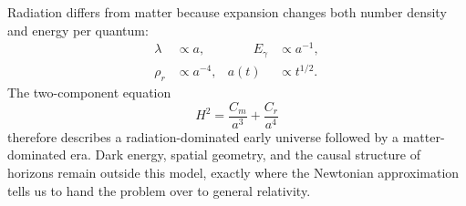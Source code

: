 Radiation differs from matter because expansion changes both number density and energy per quantum:
\begin{equation}
\begin{aligned}
\lambda&\propto a,
&\qquad E_\gamma&\propto a^{-1},\\
\rho_r&\propto a^{-4},
& a(t)&\propto t^{1/2}.
\end{aligned}
\end{equation}
The two-component equation
\begin{equation}
H^2=\frac{C_m}{a^3}+\frac{C_r}{a^4}
\end{equation}
therefore describes a radiation-dominated early universe followed by a matter-dominated era. Dark energy, spatial geometry, and the causal structure of horizons remain outside this model, exactly where the Newtonian approximation tells us to hand the problem over to general relativity.
